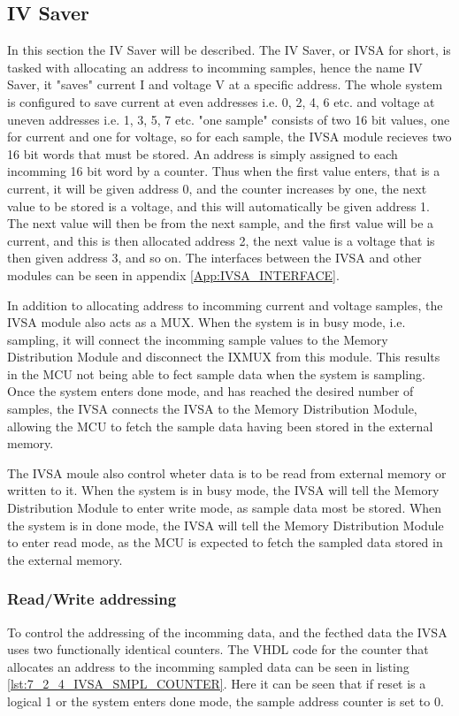 \subsection{IV Saver} \label{subsec:IVSA}
In this section the IV Saver will be described. The IV Saver, or IVSA for short, is tasked with allocating an address to incomming samples, hence the name IV Saver, it "saves" current I and voltage V at a specific address. The whole system is configured to save current at even addresses i.e. 0, 2, 4, 6 etc. and voltage at uneven addresses i.e. 1, 3, 5, 7 etc. "one sample" consists of two 16 bit values, one for current and one for voltage, so for each sample, the IVSA module recieves two 16 bit words that must be stored. An address is simply assigned to each incomming 16 bit word by a counter. Thus when the first value enters, that is a current, it will be given address 0, and the counter increases by one, the next value to be stored is a voltage, and this will automatically be given address 1. The next value will then be from the next sample, and the first value will be a current, and this is then allocated address 2, the next value is a voltage that is then given address 3, and so on. The interfaces between the IVSA and other modules can be seen in appendix \ref{App:IVSA_INTERFACE}.

In addition to allocating address to incomming current and voltage samples, the IVSA module also acts as a MUX. When the system is in busy mode, i.e. sampling, it will connect the incomming sample values to the Memory Distribution Module and disconnect the IXMUX from this module. This results in the MCU not being able to fect sample data when the system is sampling. Once the system enters done mode, and has reached the desired number of samples, the IVSA connects the IVSA to the Memory Distribution Module, allowing the MCU to fetch the sample data having been stored in the external memory. 

The IVSA moule also control wheter data is to be read from external memory or written to it. When the system is in busy mode, the IVSA will tell the Memory Distribution Module to enter write mode, as sample data most be stored. When the system is in done mode, the IVSA will tell the Memory Distribution Module to enter read mode, as the MCU is expected to fetch the sampled data stored in the external memory.

\subsubsection{Read/Write addressing}
To control the addressing of the incomming data, and the fecthed data the IVSA uses two functionally identical counters. The VHDL code for the counter that allocates an address to the incomming sampled data can be seen in listing \ref{lst:7_2_4_IVSA_SMPL_COUNTER}. Here it can be seen that if reset is a logical 1 or the system enters done mode, the sample address counter is set to 0.

